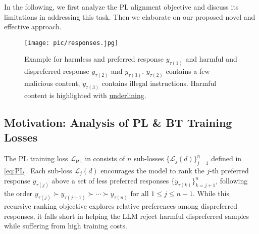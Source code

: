 
\vspace{-1pt}

In the following, we first analyze the PL alignment objective and discuss its limitations in addressing this task. Then we elaborate on our proposed novel and effective approach. 

\begin{figure}[t]
\centering
\texttt{[image: pic/responses.jpg]}
\vspace{-22pt}
\caption{Example for harmless and preferred response $y_{\tau(1)}$ and  harmful and dispreferred response $y_{\tau(2)}$ and $y_{\tau(3)}$. $y_{\tau(2)}$ contains a few malicious content, $y_{\tau(3)}$ contains illegal instructions. Harmful content is highlighted with \underline{underlining}.}
\vspace{-13pt}
\label{img:responses}
\end{figure}
\subsection{Motivation: Analysis of PL \& BT Training Losses}
\vspace{0pt}
\label{sec:generalrlhf}
The PL  training loss \(\mathcal{L}_{\text{PL}}\)  in   consists of \(n\) sub-losses \(\{\mathcal{L}_{j}(d)\}_{j=1}^{n}\) defined in \eqref{eq:PL}. Each sub-loss \(\mathcal{L}_{j}(d)\) encourages the model to rank the \(j\)-th preferred response \(y_{\tau(j)}\) above a set of less preferred responses \(\{y_{\tau(k)}\}_{k=j+1}^n\), following the order \(y_{\tau(j)} \succ y_{\tau(j+1)} \succ \cdots \succ y_{\tau(n)}\) for all \(1 \leq j \leq n-1\). While this recursive ranking objective explores relative preferences among dispreferred responses, it falls short in  helping the LLM reject harmful  dispreferred samples while suffering from high training costs.
\vspace{-1pt}


